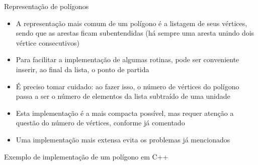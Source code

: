 \begin{frame}[fragile]{Representação de polígonos}

    \begin{itemize}
        \item A representação mais comum de um polígono é a listagem de seus vértices, sendo que 
            as arestas ficam subentendidas (há sempre uma aresta unindo dois vértice consecutivos) 
        \pause

        \item Para facilitar a implementação de algumas rotinas, pode ser conveniente inserir, 
            ao final da lista, o ponto de partida
        \pause

        \item É preciso tomar cuidado: ao fazer isso, o 
            número de vértices do polígono passa a ser o número de elementos da lista subtraído 
            de uma unidade    
        \pause

        \pause

        \item Esta implementação é a mais compacta possível, mas requer atenção a questão do 
            número de vértices, conforme já comentado
        \pause

        \item Uma implementação mais extensa evita os problemas já mencionados
    \end{itemize}

\end{frame}

\begin{frame}[fragile]{Exemplo de implementação de um polígono em C++}
\end{frame}

